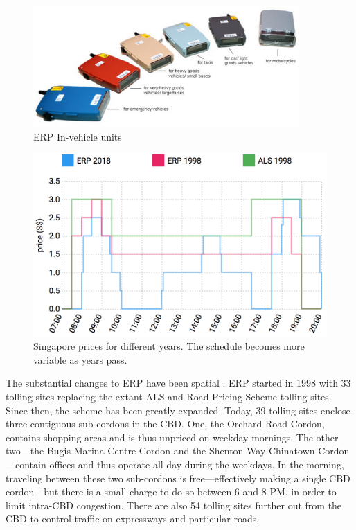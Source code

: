 \begin{figure}
	\includegraphics[width=4in]{../img/singapore-IUs.jpg}
	\caption{ERP In-vehicle units \citep{LTA2016}}
	\label{fig:singapore-IUs}
\end{figure}

\begin{figure}
	\includegraphics[width=1\textwidth]{../img/singapore-prices.png}
	\caption{Singapore prices for different years. The schedule becomes more variable as years pass. }
	\label{fig:singapore-toll-schedule}
\end{figure}

The substantial changes to ERP have been spatial \citep{Chin2009,LTA2018}. ERP started in 1998 with 33 tolling sites replacing the extant ALS and Road Pricing Scheme tolling sites. Since then, the scheme has been greatly expanded. Today, 39  tolling sites enclose three contiguous sub-cordons in the CBD. One, the Orchard Road Cordon, contains shopping areas and is thus unpriced on weekday mornings. The other two---the Bugis-Marina Centre Cordon and the Shenton Way-Chinatown Cordon---contain offices and thus operate all day during the weekdays. In the morning, traveling between these two sub-cordons is free---effectively making a single CBD cordon---but there is a small charge to do so between 6 and 8 PM, in order to limit intra-CBD congestion. There are also 54 tolling sites further out from the CBD to control traffic on expressways and particular roads. 

